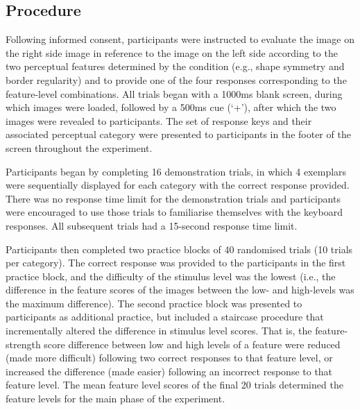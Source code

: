 \documentclass[man, 12pt, a4paper,  donotrepeattitle, floatsintext, draftfirst]{apa7}
\begin{document}


\subsection{Procedure}
Following informed consent, participants were instructed to evaluate the image on the right side image in reference to the image on the left side according to the two perceptual features determined by the condition (e.g., shape symmetry and border regularity) and to provide one of the four responses corresponding to the feature-level combinations.
All trials began with a 1000ms blank screen, during which images were loaded, followed by a 500ms cue (`+'), after which the two images were revealed to participants.
The set of response keys and their associated perceptual category were presented to participants in the footer of the screen throughout the experiment. 

Participants began by completing 16 demonstration trials, in which 4 exemplars were sequentially displayed for each category with the correct response provided.
There was no response time limit for the demonstration trials and participants were encouraged to use those trials to familiarise themselves with the keyboard responses.
All subsequent trials had a 15-second response time limit. 

Participants then completed two practice blocks of 40 randomised trials (10 trials per category).
The correct response was provided to the participants in the first practice block, and the difficulty of the stimulus level was the lowest (i.e., the difference in the feature scores of the images between the low- and high-levels was the maximum difference).
The second practice block was presented to participants as additional practice, but included a staircase procedure that incrementally altered the difference in stimulus level scores.
That is, the feature-strength score difference between low and high levels of a feature were reduced (made more difficult) following two correct responses to that feature level, or increased the difference (made easier) following an incorrect response to that feature level.
The mean feature level scores of the final 20 trials determined the feature levels for the main phase of the experiment.
\end{document}
